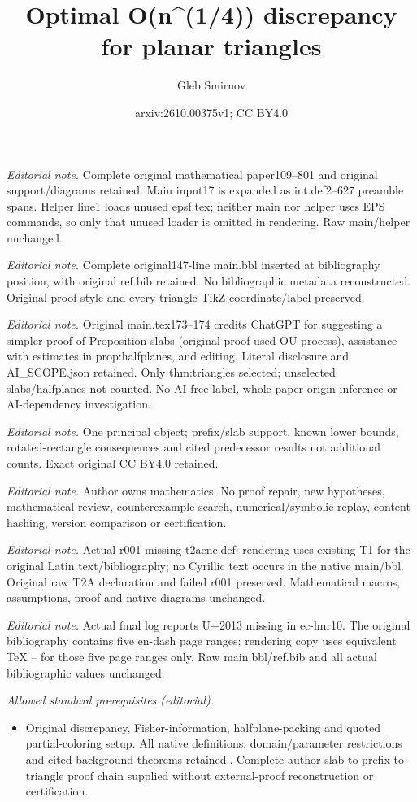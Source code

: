 \documentclass[12pt,reqno]{amsart}
\title{Optimal O(n\textasciicircum{}(1/4)) discrepancy for planar triangles}
\author{Gleb Smirnov}
\date{arxiv:2610.00375v1; CC BY4.0}
\theoremstyle{remark}
\numberwithin{equation}{section}
\begin{document}
\maketitle
\noindent\textit{Editorial note.} Complete original mathematical paper109--801 and original support/diagrams retained. Main input17 is expanded as int.def2--627 preamble spans. Helper line1 loads unused epsf.tex; neither main nor helper uses EPS commands, so only that unused loader is omitted in rendering. Raw main/helper unchanged.\par\medskip
\noindent\textit{Editorial note.} Complete original147-line main.bbl inserted at bibliography position, with original ref.bib retained. No bibliographic metadata reconstructed. Original proof style and every triangle TikZ coordinate/label preserved.\par\medskip
\noindent\textit{Editorial note.} Original main.tex173--174 credits ChatGPT for suggesting a simpler proof of Proposition slabs (original proof used OU process), assistance with estimates in prop:halfplanes, and editing. Literal disclosure and AI\_SCOPE.json retained. Only thm:triangles selected; unselected slabs/halfplanes not counted. No AI-free label, whole-paper origin inference or AI-dependency investigation.\par\medskip
\noindent\textit{Editorial note.} One principal object; prefix/slab support, known lower bounds, rotated-rectangle consequences and cited predecessor results not additional counts. Exact original CC BY4.0 retained.\par\medskip
\noindent\textit{Editorial note.} Author owns mathematics. No proof repair, new hypotheses, mathematical review, counterexample search, numerical/symbolic replay, content hashing, version comparison or certification.\par\medskip
\noindent\textit{Editorial note.} Actual r001 missing t2aenc.def: rendering uses existing T1 for the original Latin text/bibliography; no Cyrillic text occurs in the native main/bbl. Original raw T2A declaration and failed r001 preserved. Mathematical macros, assumptions, proof and native diagrams unchanged.\par\medskip
\noindent\textit{Editorial note.} Actual final log reports U+2013 missing in ec-lmr10. The original bibliography contains five en-dash page ranges; rendering copy uses equivalent TeX -- for those five page ranges only. Raw main.bbl/ref.bib and all actual bibliographic values unchanged.\par\medskip
\noindent\textit{Allowed standard prerequisites (editorial).}\begin{itemize}
\item Original discrepancy, Fisher-information, halfplane-packing and quoted partial-coloring setup. All native definitions, domain/parameter restrictions and cited background theorems retained.. Complete author slab-to-prefix-to-triangle proof chain supplied without external-proof reconstruction or certification.
\end{itemize}\medskip
\end{document}
